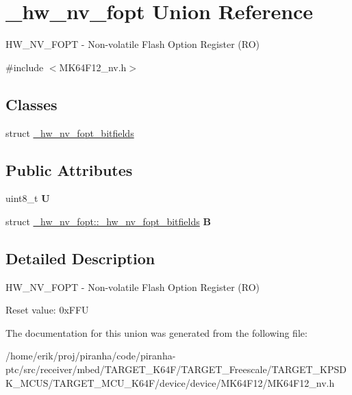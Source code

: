 \hypertarget{union__hw__nv__fopt}{}\section{\+\_\+hw\+\_\+nv\+\_\+fopt Union Reference}
\label{union__hw__nv__fopt}


H\+W\+\_\+\+N\+V\+\_\+\+F\+O\+PT -\/ Non-\/volatile Flash Option Register (RO)  




{\ttfamily \#include $<$M\+K64\+F12\+\_\+nv.\+h$>$}

\subsection*{Classes}
\begin{DoxyCompactItemize}
\item 
struct \hyperlink{struct__hw__nv__fopt_1_1__hw__nv__fopt__bitfields}{\+\_\+hw\+\_\+nv\+\_\+fopt\+\_\+bitfields}
\end{DoxyCompactItemize}
\subsection*{Public Attributes}
\begin{DoxyCompactItemize}
\item 
uint8\+\_\+t {\bfseries U}\hypertarget{union__hw__nv__fopt_acc0eb5220a4337f5168af16cb5bbeaf4}{}\label{union__hw__nv__fopt_acc0eb5220a4337f5168af16cb5bbeaf4}

\item 
struct \hyperlink{struct__hw__nv__fopt_1_1__hw__nv__fopt__bitfields}{\+\_\+hw\+\_\+nv\+\_\+fopt\+::\+\_\+hw\+\_\+nv\+\_\+fopt\+\_\+bitfields} {\bfseries B}\hypertarget{union__hw__nv__fopt_a9e1d8cdd83bffec4879d6796bbbaee2f}{}\label{union__hw__nv__fopt_a9e1d8cdd83bffec4879d6796bbbaee2f}

\end{DoxyCompactItemize}


\subsection{Detailed Description}
H\+W\+\_\+\+N\+V\+\_\+\+F\+O\+PT -\/ Non-\/volatile Flash Option Register (RO) 

Reset value\+: 0x\+F\+FU 

The documentation for this union was generated from the following file\+:\begin{DoxyCompactItemize}
\item 
/home/erik/proj/piranha/code/piranha-\/ptc/src/receiver/mbed/\+T\+A\+R\+G\+E\+T\+\_\+\+K64\+F/\+T\+A\+R\+G\+E\+T\+\_\+\+Freescale/\+T\+A\+R\+G\+E\+T\+\_\+\+K\+P\+S\+D\+K\+\_\+\+M\+C\+U\+S/\+T\+A\+R\+G\+E\+T\+\_\+\+M\+C\+U\+\_\+\+K64\+F/device/device/\+M\+K64\+F12/M\+K64\+F12\+\_\+nv.\+h\end{DoxyCompactItemize}
